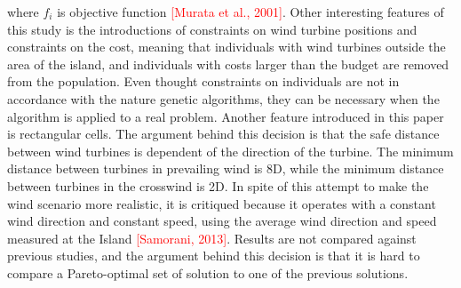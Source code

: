 where $f_i$ is objective function \textcolor{red}{[Murata et al., 2001]}. Other interesting features of this study is the introductions of constraints on wind turbine positions and constraints on the cost, meaning that individuals with wind turbines outside the area of the island, and individuals with costs larger than the budget are removed from the population. Even thought constraints on individuals are not in accordance with the nature genetic algorithms, they can be necessary when the algorithm is applied to a real problem. Another feature introduced in this paper is rectangular cells. The argument behind this decision is that the safe distance between wind turbines is dependent of the direction of the turbine. The minimum distance between turbines in prevailing wind is 8D, while the minimum distance between turbines in the crosswind is 2D. In spite of this attempt to make the wind scenario more realistic, it is critiqued because it operates with a constant wind direction and constant speed, using the average wind direction and speed measured at the Island \textcolor{red}{[Samorani, 2013]}. Results are not compared against previous studies, and the argument behind this decision is that it is hard to compare a Pareto-optimal set of solution to one of the previous solutions. \\


